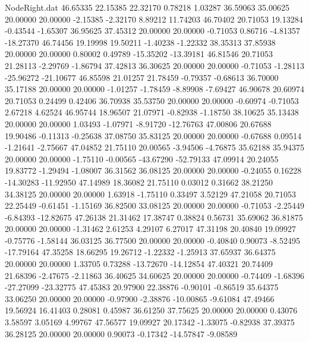 \begin{filecontents}{NodeRight.dat}
  46.65335   22.15385   22.32170     0.78218    1.03287   36.59063   35.00625   20.00000   20.00000   -2.15385   -2.32170    8.89212   11.74203
  46.70402   20.71053   19.13284    -0.43544   -1.65307   36.95625   37.45312   20.00000   20.00000   -0.71053    0.86716   -4.81357  -18.27370
  46.74456   19.19998   19.50211    -1.40238   -1.22332   38.35313   37.85938   20.00000   20.00000    0.80002    0.49789  -15.35202  -13.39181
  46.81546   20.71053   21.28113    -2.29769   -1.86794   37.42813   36.30625   20.00000   20.00000   -0.71053   -1.28113  -25.96272  -21.10677
  46.85598   21.01257   21.78459    -0.79357   -0.68613   36.70000   35.17188   20.00000   20.00000   -1.01257   -1.78459   -8.89908   -7.69427
  46.90678   20.60974   20.71053     0.24499    0.42406   36.70938   35.53750   20.00000   20.00000   -0.60974   -0.71053    2.67218    4.62524
  46.95744   18.96507   21.07971    -0.82938   -1.18750   38.10625   35.13438   20.00000   20.00000    1.03493   -1.07971   -8.91720  -12.76763
  47.00806   20.67688   19.90486    -0.11313   -0.25638   37.08750   35.83125   20.00000   20.00000   -0.67688    0.09514   -1.21641   -2.75667
  47.04852   21.75110   20.00565    -3.94506   -4.76875   35.62188   35.94375   20.00000   20.00000   -1.75110   -0.00565  -43.67290  -52.79133
  47.09914   20.24055   19.83772    -1.29494   -1.08007   36.31562   36.08125   20.00000   20.00000   -0.24055    0.16228  -14.30283  -11.92950
  47.14989   18.36082   21.75110     0.03012    0.31662   38.21250   34.38125   20.00000   20.00000    1.63918   -1.75110    0.33497    3.52129
  47.21058   20.71053   22.25449    -0.61451   -1.15169   36.82500   33.08125   20.00000   20.00000   -0.71053   -2.25449   -6.84393  -12.82675
  47.26138   21.31462   17.38747     0.38824    0.56731   35.69062   36.81875   20.00000   20.00000   -1.31462    2.61253    4.29107    6.27017
  47.31198   20.40840   19.09927    -0.75776   -1.58144   36.03125   36.77500   20.00000   20.00000   -0.40840    0.90073   -8.52495  -17.79164
  47.35258   18.66295   19.26712    -1.22332   -1.25913   37.65937   36.64375   20.00000   20.00000    1.33705    0.73288  -13.72670  -14.12854
  47.40321   20.74409   21.68396    -2.47675   -2.11863   36.40625   34.60625   20.00000   20.00000   -0.74409   -1.68396  -27.27099  -23.32775
  47.45383   20.97900   22.38876    -0.90101   -0.86519   35.64375   33.06250   20.00000   20.00000   -0.97900   -2.38876  -10.00865   -9.61084
  47.49466   19.56924   16.41403     0.28081    0.45987   36.61250   37.75625   20.00000   20.00000    0.43076    3.58597    3.05169    4.99767
  47.56577   19.09927   20.17342    -1.33075   -0.82938   37.39375   36.28125   20.00000   20.00000    0.90073   -0.17342  -14.57847   -9.08589

\end{filecontents}
